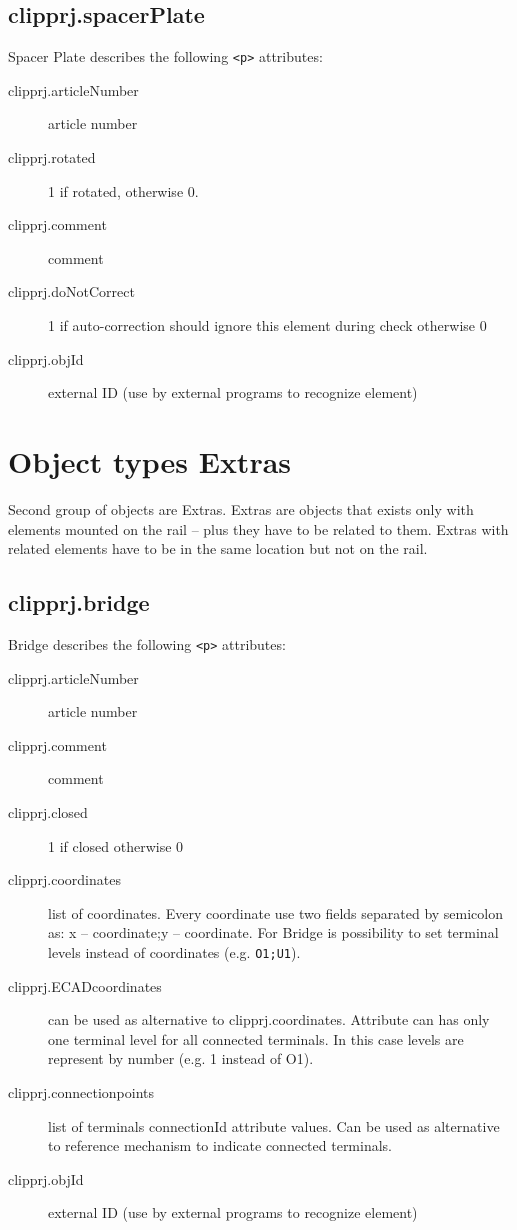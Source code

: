 \documentclass[%
	a4paper,
	oneside,
	listof=numbered,
	parskip=half,
	headsepline=true,
	footsepline=false,
	normalheadings,
	0.7headlines,
	headexclude,
	]{scrbook}
\begin{document}
\subsection{clipprj.spacerPlate}
 
Spacer Plate describes the following \verb|<p>| attributes: 

\begin{description}
	\item[clipprj.articleNumber] article number 
	\item[clipprj.rotated] 1 if rotated, otherwise 0. 
	\item[clipprj.comment] comment 
	\item[clipprj.doNotCorrect] 1 if auto-correction should ignore this element during check otherwise 0 
	\item[clipprj.objId] external ID (use by external programs to recognize element) 
\end{description}

\section{Object types \glqq{}Extras\grqq{}} 
 
Second group of objects are Extras. Extras are objects that exists only with elements mounted on the rail – plus they have to be related to them. Extras with related elements have to be in the same location but not on the rail. 

\subsection{clipprj.bridge}
 
Bridge describes the following \verb|<p>| attributes: 

\begin{description}
	\item[clipprj.articleNumber] article number 
	\item[clipprj.comment] comment 
	\item[clipprj.closed] 1 if closed otherwise 0 
	\item[clipprj.coordinates] list of coordinates. Every coordinate use two fields separated by semicolon as: x – coordinate;y – coordinate. For Bridge is possibility to set terminal levels instead of coordinates (e.g. \verb|O1;U1|). 
	\item[clipprj.ECADcoordinates] can be used as alternative to clipprj.coordinates. Attribute can has only one terminal level for all connected terminals. In this case levels are represent by number (e.g. 1 instead of O1). 
	\item[clipprj.connectionpoints] list of terminals connectionId attribute values. Can be used as alternative to reference mechanism to indicate connected terminals. 
	\item[clipprj.objId] external ID (use by external programs to recognize element) 
\end{description}
\end{document}
